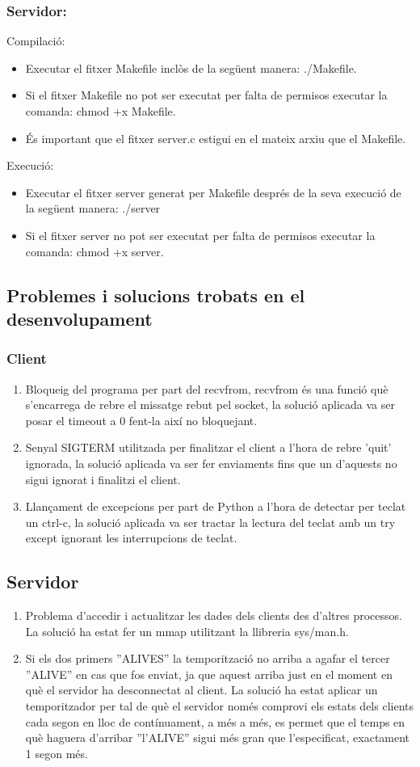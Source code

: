 \documentclass[11pt]{article}
\begin{document}
\subsubsection*{Servidor:}
Compilació:
\begin{itemize}
\item Executar el fitxer Makefile inclòs de la següent manera: ./Makefile.
\item Si el fitxer Makefile no pot ser executat per falta de permisos executar la comanda: chmod +x Makefile.
\item És important que el fitxer server.c estigui en el mateix arxiu que el Makefile.
\end{itemize}
Execució:
\begin{itemize}
\item Executar el fitxer server generat per Makefile després de la seva execució de la següent manera: ./server
\item Si el fitxer server no pot ser executat per falta de permisos executar la comanda: chmod +x server.
\end{itemize}
\newpage
\subsection{Problemes i solucions trobats en el desenvolupament}
\subsubsection*{Client}
\justify
\begin{enumerate}
\item Bloqueig del programa per part del recvfrom, recvfrom és una funció què s'encarrega de rebre el missatge rebut pel socket, la solució aplicada va ser posar el timeout a 0 fent-la així no bloquejant.
\item Senyal SIGTERM utilitzada per finalitzar el client a l'hora de rebre 'quit' ignorada, la solució aplicada va ser fer enviaments fins que un d'aquests no sigui ignorat i finalitzi el client.
\item Llançament de excepcions per part de Python a l'hora de detectar per teclat un ctrl-c, la solució aplicada va ser tractar la lectura del teclat amb un try except ignorant les interrupcions de teclat.
\end{enumerate}
\subsection*{Servidor}
\begin{enumerate}
\item Problema d'accedir i actualitzar les dades dels clients des d'altres processos. La solució ha estat fer un mmap utilitzant la llibreria sys/man.h.
\item Si els dos primers ''ALIVES'' la temporització no arriba a agafar el tercer ''ALIVE'' en cas que fos enviat, ja que aquest arriba just en el moment en què el servidor ha desconnectat al client. La solució ha estat aplicar un temporitzador per tal de què el servidor només comprovi els estats dels clients cada segon en lloc de contínuament, a més a més, es permet que el temps en què haguera d'arribar ''l'ALIVE'' sigui més gran que l'especificat, exactament 1 segon més.
\end{enumerate}
\end{document}
